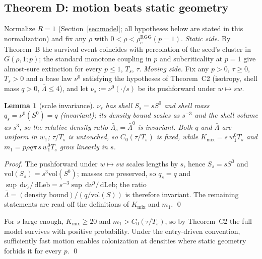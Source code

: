 \documentclass[11pt]{article}
\newtheorem{lemma}{Lemma}
\newcommand{\dd}{\,\mathrm{d}}
\newcommand{\Kmix}{K_{\mathrm{mix}}}
\newcommand{\Ts}{T_s}
\newcommand{\relL}{\bar\Lambda}
\begin{document}
\subsection{Theorem D: motion beats static geometry}\label{app:thmDapp}

Normalize $R=1$ (Section~\ref{sec:model}; all hypotheses below are stated
in this normalization) and fix any $\rho$ with
$0<\rho<\rho_c^{\mathrm{RGG}}(p{=}1)$. \emph{Static side.} By Theorem~B
the survival event coincides with percolation of the seed's cluster in
$G(\rho,1;p)$; the standard monotone coupling in $p$ and subcriticality at
$p=1$ give almost-sure extinction for every $p\le1$, $\Ts$, $\tau$.
\emph{Moving side.} Fix any $p>0$, $\tau\ge0$, $\Ts>0$ and a base law
$\nu^0$ satisfying the hypotheses of Theorem~C2 (isotropy, shell mass
$q>0$, $\relL\le4$), and let $\nu_s:=\nu^0(\cdot/s)$ be its pushforward
under $w\mapsto sw$.

\begin{lemma}[scale invariance]\label{lem:scale}
$\nu_s$ has shell $S_s=sS^0$ and shell mass $q_s=\nu^0(S^0)=q$
(invariant); its density bound scales as $s^{-3}$ and the shell volume as
$s^3$, so the relative density ratio $\relL_s=\relL^0$ is invariant. Both
$q$ and $\relL$ are uniform in $w_1$; $\tau/\Ts$ is untouched, so
$C_0(\tau/\Ts)$ is fixed, while $\Kmix=s\,w_1^0\Ts$ and
$m_1=p\rho q\pi\,s\,w_1^0\Ts$ grow linearly in $s$.
\end{lemma}

\noindent\emph{Proof.} The pushforward under $w\mapsto sw$ scales lengths
by $s$, hence $S_s=sS^0$ and $\mathrm{vol}(S_s)=s^3\mathrm{vol}(S^0)$;
masses are preserved, so $q_s=q$ and
$\sup\dd\nu_s/\dd\mathrm{Leb}=s^{-3}\sup\dd\nu^0/\dd\mathrm{Leb}$; the
ratio $\relL=(\text{density bound})/(q/\mathrm{vol}(S))$ is therefore
invariant. The remaining statements are read off the definitions of
$\Kmix$ and $m_1$. \qed

\smallskip
For $s$ large enough, $\Kmix\ge20$ and $m_1>C_0(\tau/\Ts)$, so by
Theorem~C2 the full model survives with positive probability. Under the
entry-driven convention, sufficiently fast motion enables colonization at
densities where static geometry forbids it for every $p$. \qed



\end{document}
